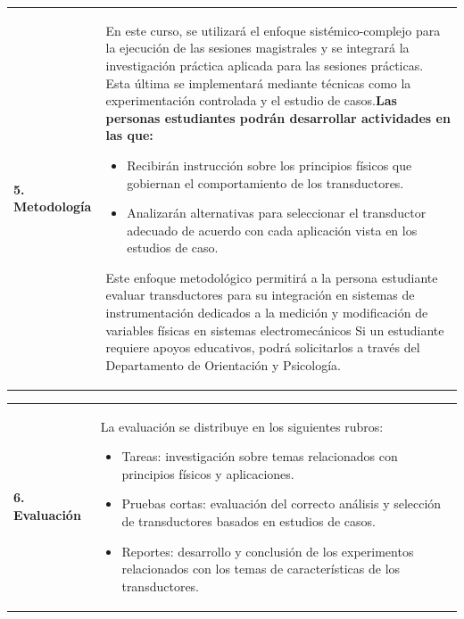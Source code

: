 \documentclass[letterpaper]{article}%
\begin{document}
\begin{tabularx}{\textwidth}{p{3cm}p{13cm}}%
\par\fontsize{12}{14}\selectfont \textbf{\textcolor{parte}{5. Metodología}}&En este curso, se utilizará el enfoque sistémico-complejo para la ejecución de las sesiones magistrales y se integrará la investigación práctica aplicada para las sesiones prácticas. Esta última se implementará mediante técnicas como la experimentación controlada y el estudio de casos.\newline\newline \textbf{Las personas estudiantes podrán desarrollar actividades en las que:} \newline\begin{itemize}\item Recibirán instrucción sobre los principios físicos que gobiernan el comportamiento de los transductores.\item Analizarán alternativas para seleccionar el transductor adecuado de acuerdo con cada aplicación vista en los estudios de caso.\end{itemize}\vspace*{2mm}Este enfoque metodológico permitirá a la persona estudiante evaluar transductores para su integración en sistemas de instrumentación dedicados a la medición y modificación de variables físicas en sistemas electromecánicos\vspace*{2mm} \newline  Si un estudiante requiere apoyos educativos, podrá solicitarlos a través del Departamento de Orientación y Psicología. \newline \\%
\end{tabularx}%
\vspace*{2mm}%
\newline%
\begin{tabularx}{\textwidth}{p{3cm}p{13cm}}%
\par\fontsize{12}{14}\selectfont \textbf{\textcolor{parte}{6. Evaluación}}&La evaluación se distribuye en los siguientes rubros: \newline \begin{itemize} \item Tareas: investigación sobre temas relacionados con principios físicos y aplicaciones. \item Pruebas cortas: evaluación del correcto análisis y selección de transductores basados en estudios de casos. \item Reportes: desarrollo y conclusión de los experimentos relacionados con los temas de características de los transductores. \end{itemize}\\%
\end{tabularx}%
\end{document}
